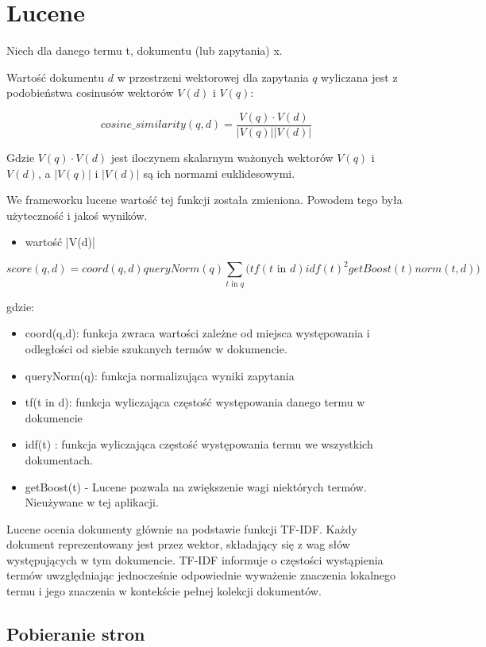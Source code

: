 \section{Lucene}


Niech dla danego termu t, dokumentu (lub zapytania) x.


Wartość dokumentu $d$ w przestrzeni wektorowej dla zapytania $q$ wyliczana jest z podobieństwa cosinusów wektorów $V(d)$ i $V(q)$:

\begin{equation}
cosine\_similarity(q,d) = \frac{V(q) \cdot V(d) }{ |V(q)||V(d)|}
\end{equation}

Gdzie $V(q) \cdot V(d)$ jest iloczynem skalarnym ważonych wektorów $V(q)$ i $V(d)$, a $|V(q)|$ i $|V(d)|$ są ich normami euklidesowymi. 

We frameworku lucene wartość tej funkcji została zmieniona. Powodem tego była użyteczność i jakoś wyników. 

\begin{itemize}
\item wartość |V(d)| 
\end{itemize}


\begin{equation}
score(q,d) =   coord(q,d)    queryNorm(q) 
\sum_{t \text{ in } q}  \bigg( tf(t\text{ in } d)    idf(t)^2    getBoost(t)   norm(t,d) \bigg)
\end{equation}

gdzie:
\begin{itemize}
	\item coord(q,d): funkcja zwraca wartości zależne od miejsca występowania i odległości od siebie szukanych termów w dokumencie.
	\item queryNorm(q): funkcja normalizująca wyniki zapytania
	\item tf(t in d): funkcja wyliczająca częstość występowania danego termu w dokumencie
	\item idf(t) : funkcja wyliczająca częstość występowania termu we wszystkich dokumentach.
	\item getBoost(t) - Lucene pozwala na zwiększenie wagi niektórych termów. Nieużywane w tej aplikacji.
\end{itemize}

Lucene ocenia dokumenty głównie na podstawie funkcji TF-IDF. Każdy dokument reprezentowany jest przez wektor, składający się z wag słów występujących w tym dokumencie. TF-IDF informuje o częstości wystąpienia termów uwzględniając jednocześnie odpowiednie wyważenie znaczenia lokalnego termu i jego znaczenia w kontekście pełnej kolekcji dokumentów.


\subsection{Pobieranie stron}
